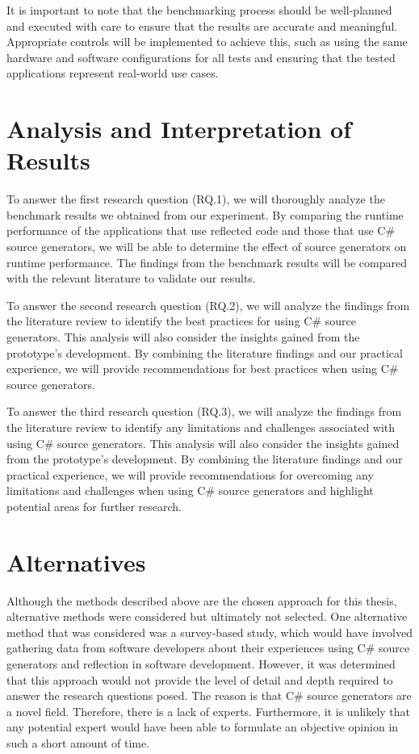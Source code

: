 It is important to note that the benchmarking process should be well-planned and executed with care to ensure that the results are accurate and meaningful. Appropriate controls will be implemented to achieve this, such as using the same hardware and software configurations for all tests and ensuring that the tested applications represent real-world use cases.


\section{Analysis and Interpretation of Results}

To answer the first research question (RQ.1), we will thoroughly analyze the benchmark results we obtained from our experiment. By comparing the runtime performance of the applications that use reflected code and those that use C\# source generators, we will be able to determine the effect of source generators on runtime performance. The findings from the benchmark results will be compared with the relevant literature to validate our results.

To answer the second research question (RQ.2), we will analyze the findings from the literature review to identify the best practices for using C\# source generators. This analysis will also consider the insights gained from the prototype's development. By combining the literature findings and our practical experience, we will provide recommendations for best practices when using C\# source generators.

To answer the third research question (RQ.3), we will analyze the findings from the literature review to identify any limitations and challenges associated with using C\# source generators. This analysis will also consider the insights gained from the prototype's development. By combining the literature findings and our practical experience, we will provide recommendations for overcoming any limitations and challenges when using C\# source generators and highlight potential areas for further research.

\section{Alternatives}

Although the methods described above are the chosen approach for this thesis, alternative methods were considered but ultimately not selected. One alternative method that was considered was a survey-based study, which would have involved gathering data from software developers about their experiences using C\# source generators and reflection in software development. However, it was determined that this approach would not provide the level of detail and depth required to answer the research questions posed. The reason is that C\# source generators are a novel field. Therefore, there is a lack of experts. Furthermore, it is unlikely that any potential expert would have been able to formulate an objective opinion in such a short amount of time.

